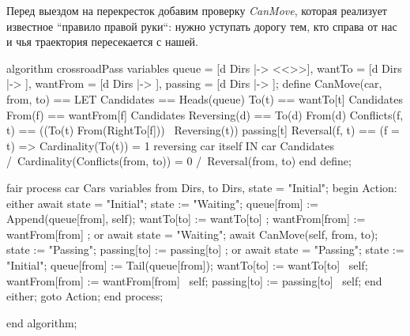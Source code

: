\documentclass[14pt, openany]{book}
\begin{document}
Перед выездом на перекресток добавим проверку \emph{CanMove}, которая реализует известное ``правило правой руки``: нужно уступать дорогу тем, кто справа от нас и чья траектория пересекается с нашей.

\begin{ppcal}
algorithm crossroadPass
variables
  queue = [d \in Dirs |-> <<>>],
  wantTo = [d \in Dirs |-> {}],
  wantFrom = [d \in Dirs |-> {}],
  passing = [d \in Dirs |-> {}];
define
  CanMove(car, from, to) == 
    LET
      Candidates == Heads(queue)
      To(t) == wantTo[t] \intersect Candidates
      From(f) == wantFrom[f] \intersect Candidates
      Reversing(d) == To(d) \intersect From(d) 
      Conflicts(f, t) == ((To(t) \intersect From(RightTo[f])) \ Reversing(t)) \union passing[t]
      Reversal(f, t) == (f = t) => Cardinality(To(t)) = 1 \* reversing car itself
    IN
    car \in Candidates /\
    Cardinality(Conflicts(from, to)) = 0 /\
    Reversal(from, to)
end define;

fair process car \in Cars
variables
  from \in Dirs, to \in Dirs, state = "Initial";
begin
  Action:
    either
      await state = "Initial";
      state := "Waiting";
      queue[from] := Append(queue[from], self);
      wantTo[to] := wantTo[to] ;
      wantFrom[from] := wantFrom[from] ;
    or
      await state = "Waiting";
      await CanMove(self, from, to);
      state := "Passing";
      passing[to] := passing[to] ;
    or
      await state = "Passing";
      state := "Initial";
      queue[from] := Tail(queue[from]);
      wantTo[to] := wantTo[to] \ {self};
      wantFrom[from] := wantFrom[from] \ {self};
      passing[to] := passing[to] \ {self};
    end either;
    goto Action;
end process;

end algorithm;
\end{ppcal}
\end{document}
